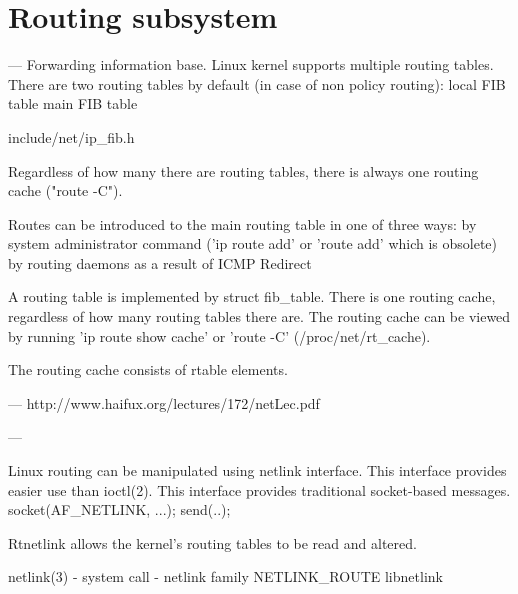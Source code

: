 
\chapter{Routing subsystem}
---
Forwarding information base.
Linux kernel supports multiple routing tables.
There are two routing tables by default (in case of non policy routing):
local FIB table
main FIB table

include/net/ip_fib.h

Regardless of how many there are routing tables, there is always one routing cache ("route -C").


Routes can be introduced to the main routing table in one of three ways:
by system administrator command ('ip route add' or 'route add' which is obsolete)
by routing daemons
as a result of ICMP Redirect

A routing table is implemented by struct fib_table.
There is one routing cache, regardless of how many routing tables there are.
The routing cache can be viewed by running 'ip route show cache' or 'route -C' (/proc/net/rt_cache).

The routing cache consists of rtable elements.


---
http://www.haifux.org/lectures/172/netLec.pdf


---

Linux routing can be manipulated using netlink interface.
This interface provides easier use than ioctl(2).
This interface provides traditional socket-based messages.
socket(AF_NETLINK, ...);
send(..);

Rtnetlink allows the kernel's routing tables to be read and altered.

netlink(3) - system call - netlink family NETLINK_ROUTE
libnetlink
